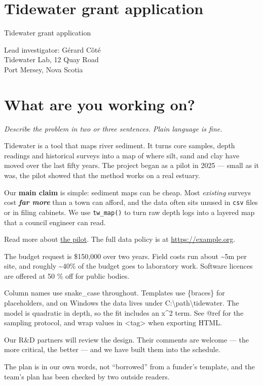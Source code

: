 \section{Tidewater grant application}

Tidewater grant application

Lead investigator: Gérard Côté\\
Tidewater Lab, 12 Quay Road\\
Port Mersey, Nova Scotia

\section{What are you working on?}

\emph{Describe the problem in two or three sentences. Plain language is fine.}

Tidewater is a tool that maps river sediment. It turns core samples, depth readings and historical surveys into a map of where silt, sand and clay have moved over the last fifty years. The project began as a pilot in 2025 — small as it was, the pilot showed that the method works on a real estuary.

Our \textbf{main claim} is simple: sediment maps can be cheap. Most \emph{existing} surveys cost \textbf{\emph{far more}} than a town can afford, and the data often sits unused in \texttt{csv} files or in filing cabinets. We use \texttt{tw\_map()} to turn raw depth logs into a layered map that a council engineer can read.

Read more about \href{https://example.org/pilot}{the pilot}. The full data policy is at \url{https://example.org}.

The budget request is \$150,000 over two years. Field costs run about \textasciitilde{}5m per site, and roughly \textasciitilde{}40\% of the budget goes to laboratory work. Software licences are offered at 50 \% off for public bodies.

Column names use snake\_case throughout. Templates use \{braces\} for placeholders, and on Windows the data lives under C:\textbackslash{}path\textbackslash{}tidewater. The model is quadratic in depth, so the fit includes an x\textasciicircum{}2 term. See @ref for the sampling protocol, and wrap values in <tag> when exporting HTML.

Our R\&D partners will review the design. Their comments are welcome — the more critical, the better — and we have built them into the schedule.

The plan is in our own words, not “borrowed” from a funder’s template, and the team’s plan has been checked by two outside readers.

